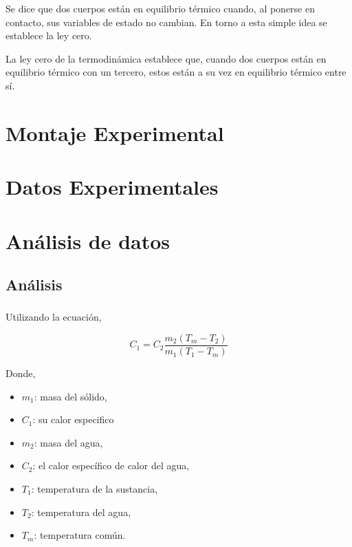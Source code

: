 \documentclass[letterpaper, 12pt]{article}
\begin{document}
Se dice que dos cuerpos están en equilibrio térmico cuando,
al ponerse en contacto, sus variables de estado no cambian.
En torno a esta simple idea se establece la ley cero.

La ley cero de la termodinámica establece que, cuando dos
cuerpos están en equilibrio térmico con un tercero, estos
están a su vez en equilibrio térmico entre sí.

\section{Montaje Experimental}

\section{Datos Experimentales}

\noindent\makebox[\linewidth]{\rule{.9\linewidth}{0.4pt}}

\section{Análisis de datos}

\subsection{Análisis}

\subsubsection{}

Utilizando la ecuación,

\begin{equation}
      C_{1} = C_{2} \frac{m_{2} (T_{m} - T_{2})}{m_1 (T_{1} - T_{m})}
      \label{eq:calor_especifico_1}
\end{equation}

Donde,

\begin{itemize}[label=$\triangleright$]
      \item $m_{1}$: masa del sólido,
      \item $C_{1}$: su calor especifico
      \item $m_{2}$: masa del agua,
      \item $C_{2}$: el calor específico de calor del agua,
      \item $T_{1}$: temperatura de la sustancia,
      \item $T_{2}$: temperatura del agua,
      \item $T_{m}$: temperatura común.
\end{itemize}
\end{document}
